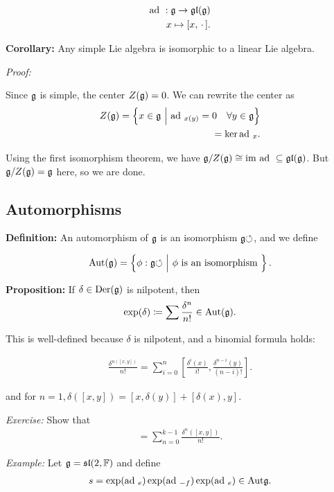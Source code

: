 \begin{align*}
\mathrm{ad}~: {\mathfrak{g}} \to {\mathfrak{gl}}({\mathfrak{g}}) \\
x \mapsto [x, {\,\cdot\,}]
.\end{align*}

\textbf{Corollary:} Any simple Lie algebra is isomorphic to a linear Lie
algebra.

\emph{Proof:}

Since \({\mathfrak{g}}\) is simple, the center \(Z({\mathfrak{g}}) = 0\). We can rewrite
the center as \begin{align*}
Z({\mathfrak{g}}) = \left\{{x\in{\mathfrak{g}} {~\mathrel{\Big|}~} \mathrm{ad}~_{x(y)} = 0 \quad \forall y\in{\mathfrak{g}}}\right\} \\
= \ker \mathrm{ad}~_{x}
.\end{align*}

Using the first isomorphism theorem, we have
\({\mathfrak{g}}/Z({\mathfrak{g}}) \cong {\text{im}~} \mathrm{ad}~ \subseteq {\mathfrak{gl}} ({\mathfrak{g}})\). But
\({\mathfrak{g}}/Z({\mathfrak{g}}) = {\mathfrak{g}}\) here, so we are done.

\hypertarget{automorphisms}{%
\subsection{Automorphisms}\label{automorphisms}}

\textbf{Definition:} An automorphism of \({\mathfrak{g}}\) is an isomorphism
\({\mathfrak{g}}{\circlearrowleft}\), and we define

\begin{align*}
{\text{Aut}}({\mathfrak{g}}) = \left\{{\phi:{\mathfrak{g}}{\circlearrowleft} {~\mathrel{\Big|}~} \phi \text{ is an isomorphism }}\right\}
.\end{align*}

\textbf{Proposition:} If \(\delta \in \mathrm{Der}({\mathfrak{g}})\) is
nilpotent, then \[
\exp(\delta)\coloneqq\sum \frac{\delta^{n}} {n!} \in {\text{Aut}}({\mathfrak{g}}).
\]

This is well-defined because \(\delta\) is nilpotent, and a binomial
formula holds:

\begin{align*}
\frac{\delta^{n([x,y])}}{n!} = \sum_{i=0}^{n} [\frac{\delta^{i}(x)}{i!}, \frac{\delta^{n-i}(y)}{(n-i)!}]
.\end{align*}

and for \(n=1, \delta([x,y]) = [x, \delta(y)] + [\delta(x), y]\).

\emph{Exercise:} Show that \begin{align*}
[(\exp \delta)(x), (\exp\delta)(y)] = \sum_{n=0}^{k-1} \frac {\delta^{n}([x, y])} {n!}
.\end{align*}

\emph{Example:} Let \({\mathfrak{g}} = {\mathfrak{sl}}(2, {\mathbb{F}})\) and define \begin{align*}
s = \exp(\mathrm{ad}~_{e}) \exp(\mathrm{ad}~_{-f}) \exp(\mathrm{ad}~_{e}) \in {\text{Aut}} {\mathfrak{g}}
.\end{align*}

